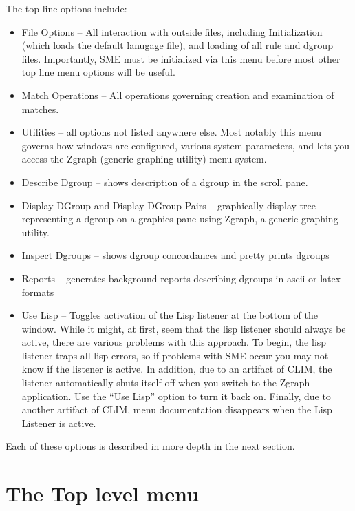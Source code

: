 \begin{center}
The top line options include:

\begin{itemize}   
\item File Options -- All interaction with outside files, including
Initialization (which loads the default lanugage file), and loading of
all rule and dgroup files. Importantly, SME must be initialized via
this menu before most other top line menu options will be useful.

\item Match Operations -- All operations governing creation and
examination of matches.

\item Utilities -- all options not listed anywhere else. Most notably
this menu governs how windows are configured, various system
parameters, and lets you access the Zgraph (generic graphing utility)
menu system. 

\item Describe Dgroup -- shows description of a dgroup in the scroll pane.

\item Display DGroup and Display DGroup Pairs -- graphically display
tree representing a dgroup on a graphics pane using Zgraph, a generic
graphing utility.

\item Inspect Dgroups -- shows dgroup concordances and pretty prints dgroups

\item Reports -- generates background reports describing dgroups in
ascii or latex formats

\item Use Lisp -- Toggles activation of the Lisp listener at the
bottom of the window. While it might, at first, seem that the lisp
listener should always be active, there are various problems with this
approach. To begin, the lisp listener traps all lisp errors, so
if problems with SME occur you may not know if the listener is
active.  In addition, due to an artifact of CLIM, the listener
automatically shuts itself off when you switch to the Zgraph
application. Use the ``Use Lisp'' option to turn it back on. Finally,
due to another artifact of CLIM, menu documentation disappears when
the Lisp Listener is active.

\end {itemize}

Each of these options is described in more depth in the next section.

\section{The Top level menu}

\end{center}
